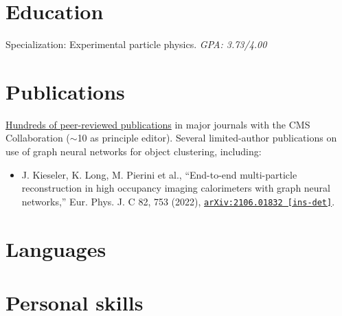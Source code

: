 \documentclass[9pt,a4paper]{moderncv}
\begin{document}
\section{Education}
{
    Specialization: Experimental particle physics.
    \normalsize \textit{GPA: 3.73/4.00} 
}

\section{Publications}
\href{https://inspirehep.net/authors/1280606}{Hundreds of peer-reviewed publications} in major journals with the CMS Collaboration ($\sim$10 as principle editor). Several limited-author publications on use of graph neural networks for object clustering, including:
\begin{itemize}
    \item J. Kieseler, K. Long, M. Pierini et al., ``End-to-end multi-particle reconstruction in high occupancy imaging calorimeters with graph neural networks,'' Eur. Phys. J. C 82, 753 (2022), \href{https://arxiv.org/abs/2106.01832}{\texttt{arXiv:2106.01832 [ins-det]}}.
\end{itemize}

\pagebreak
\section{Languages}

\section{Personal skills}
\end{document}
